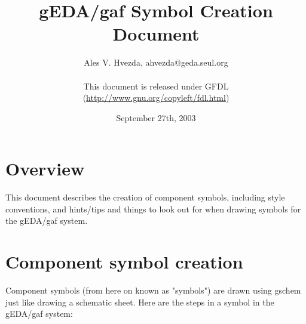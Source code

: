 \documentclass{article}
\title{gEDA/gaf Symbol Creation Document}
\author{Ales V. Hvezda, ahvezda@geda.seul.org\\
	\\
	This document is released under GFDL\\ 
	(\url{http://www.gnu.org/copyleft/fdl.html})}
\date{September 27th, 2003}
\begin{document}
\maketitle
\newpage

\tableofcontents
\newpage


\section{Overview}

This document describes the creation of component symbols, including style
conventions, and hints/tips and things to look out for when drawing symbols
for the gEDA/gaf system.

\section{Component symbol creation}

Component symbols (from here on known as "symbols") are drawn
using gschem just like drawing a schematic sheet.  Here are the steps in
a symbol in the gEDA/gaf system:
\end{document}
